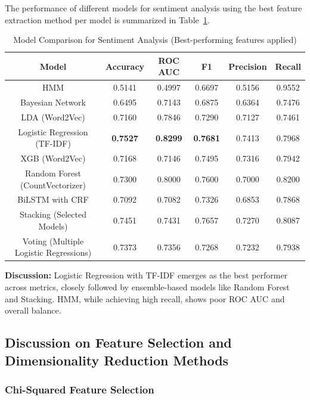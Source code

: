 The performance of different models for sentiment analysis using the best feature extraction method per model is summarized in Table~\ref{tab:model_comparison}.

\begin{table}[H]
\centering
\caption{Model Comparison for Sentiment Analysis (Best-performing features applied)}
\label{tab:model_comparison}
\renewcommand{\arraystretch}{1.5}
\begin{tabular}{||c|c|c|c|c|c||}
\hline
\textbf{Model} & \textbf{Accuracy} & \textbf{ROC AUC} & \textbf{F1} & \textbf{Precision} & \textbf{Recall} \\
\hline
HMM & 0.5141 & 0.4997 & 0.6697 & 0.5156 & 0.9552 \\
Bayesian Network & 0.6495 & 0.7143 & 0.6875 & 0.6364 & 0.7476 \\
LDA (Word2Vec) & 0.7160 & 0.7846 & 0.7290 & 0.7127 & 0.7461 \\
Logistic Regression (TF-IDF) & \textbf{0.7527} & \textbf{0.8299} & \textbf{0.7681} & 0.7413 & 0.7968 \\
XGB (Word2Vec) & 0.7168 & 0.7146 & 0.7495 & 0.7316 & 0.7942 \\
Random Forest (CountVectorizer) & 0.7300 & 0.8000 & 0.7600 & 0.7000 & 0.8200 \\
BiLSTM with CRF & 0.7092 & 0.7082 & 0.7326 & 0.6853 & 0.7868 \\
Stacking (Selected Models) & 0.7451 & 0.7431 & 0.7657 & 0.7270 & 0.8087 \\
Voting (Multiple Logistic Regressions) & 0.7373 & 0.7356 & 0.7268 & 0.7232 & 0.7938 \\
\hline
\end{tabular}
\end{table}

\textbf{Discussion:} Logistic Regression with TF-IDF emerges as the best performer across metrics, closely followed by ensemble-based models like Random Forest and Stacking. HMM, while achieving high recall, shows poor ROC AUC and overall balance.

\subsection{Discussion on Feature Selection and Dimensionality Reduction Methods}

\subsubsection{Chi-Squared Feature Selection}

